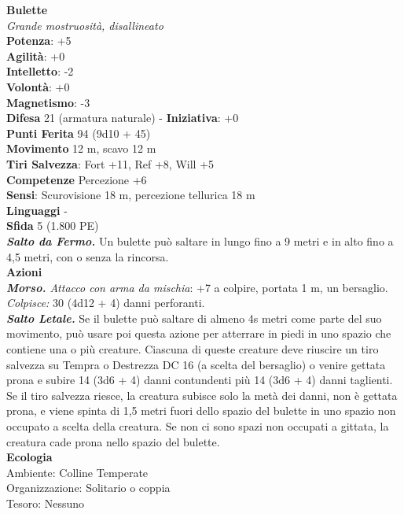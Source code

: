 \begin{multicols}{2}
\medskip\textbf{Bulette}\\
\emph{Grande mostruosità, disallineato}\\
\textbf{Potenza}: +5\\
\textbf{Agilità}: +0\\
\textbf{Intelletto}: -2\\
\textbf{Volontà}: +0\\
\textbf{Magnetismo}: -3\\
\textbf{Difesa} 21 (armatura naturale) - \textbf{Iniziativa}: +0\\
\textbf{Punti Ferita} 94 (9d10 + 45)\\
\textbf{Movimento} 12 m, scavo 12 m\\
\textbf{Tiri Salvezza}: Fort +11, Ref +8, Will +5\\
\textbf{Competenze} Percezione +6\\
\textbf{Sensi}: Scurovisione 18 m, percezione tellurica 18 m\\
\textbf{Linguaggi} -\\
\textbf{Sfida} 5 (1.800 PE)\smallskip\\
\emph{\textbf{Salto da Fermo.}} Un bulette può saltare in lungo fino a 9 metri e in alto fino a 4,5 metri, con o senza la rincorsa.\\
\smallskip\textbf{Azioni}\\
\emph{\textbf{Morso.} Attacco con arma da mischia}: +7 a colpire, portata 1 m, un bersaglio.\\
\emph{Colpisce:} 30 (4d12 + 4) danni perforanti.\\
\emph{\textbf{Salto Letale.}} Se il bulette può saltare di almeno 4s metri come parte del suo movimento, può usare poi questa azione per atterrare in piedi in uno spazio che contiene una o più creature. Ciascuna di queste creature deve riuscire un tiro salvezza su Tempra o Destrezza DC 16 (a scelta del bersaglio) o venire gettata prona e subire 14 (3d6 + 4) danni contundenti più 14 (3d6 + 4) danni taglienti. Se il tiro salvezza riesce, la creatura subisce solo la metà dei danni, non è gettata prona, e viene spinta di 1,5 metri fuori dello spazio del bulette in uno spazio non occupato a scelta della creatura. Se non ci sono spazi non occupati a gittata, la creatura cade prona nello spazio del bulette.\\
\textbf{Ecologia}\\
Ambiente: Colline Temperate\\
Organizzazione: Solitario o coppia\\
Tesoro: Nessuno\\

\end{multicols}
